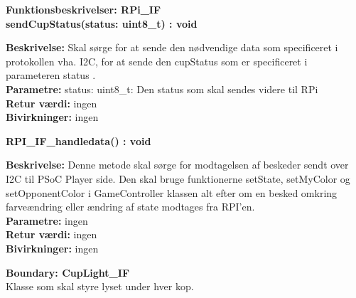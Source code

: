 \documentclass[Arkitektur/System_main.tex]{subfiles}
\begin{document}
{\large\textbf{Funktionsbeskrivelser: RPi\_IF}}\\[0.2cm]
\textbf{sendCupStatus(status: uint8\_t) : void}
\begin{adjustwidth}{1cm}{0pt}
\textbf{Beskrivelse:} Skal sørge for at sende den nødvendige data som specificeret i protokollen vha. I2C, for at sende den cupStatus som er specificeret i parameteren status .\\[0.2cm]
\textbf{Parametre:} status: uint8\_t: Den status som skal sendes videre til RPi \\[0.2cm]
\textbf{Retur værdi:} ingen \\[0.2cm]
\textbf{Bivirkninger:} ingen \\[0.2cm]
\end{adjustwidth}

\textbf{RPI\_IF\_handledata() : void}
\begin{adjustwidth}{1cm}{0pt}
\textbf{Beskrivelse:}
Denne metode skal sørge for modtagelsen af beskeder sendt over I2C til PSoC Player side. Den skal bruge funktionerne setState, setMyColor og setOpponentColor i GameController klassen alt efter om en besked omkring farveændring eller ændring af state  modtages fra RPI'en.
\\[0.2cm]
\textbf{Parametre:} ingen \\[0.2cm]
\textbf{Retur værdi:} ingen \\[0.2cm]
\textbf{Bivirkninger:} ingen \\[0.2cm]
\end{adjustwidth}

{\large\textbf{Boundary:  CupLight\_IF}}\\
Klasse som skal styre lyset under hver kop.
\end{document}
